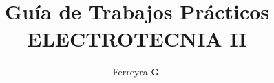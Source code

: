 \usepackage[spanish]{babel}
\usepackage[american]{circuitikz}
\usepackage{iramA4,amsmath,pgfplots,newtxtext,newtxmath,steinmetz}
\usepackage{sectsty,longtable,enumitem,tikz,subfiles,rotating}
\usepackage[toc]{glossaries}
\usepackage{subfiles}
\usepackage[]{toolsgf}
\usepackage{titletoc}
\usepackage{sectsty}
\usepackage{fancyhdr,geometry}
\usepackage{pdfpages}
\usepackage{titlesec}
\usepackage{cancel}

    \sectionfont{\sffamily\Large}
    \subsectionfont{\sffamily}

\pgfplotsset{compat=1.7}

\newcommand{\materia}{ELECTROTECNIA II}
\newcommand{\TP}{}
\newcommand{\logo}{images/logos/4124}
\newcommand{\email}{gustavoferreyra@outlook.com}
\newcommand{\classroomcode}{.......}
\newcommand{\urlqr}{https://es.scribd.com/document/528527875/}
\title{ \logoo \\ \Huge Guía de Trabajos Prácticos\\  \textbf{\materia}}
\author{Ferreyra G.}
\date{}
\sectionfont{\sffamily}
\subsectionfont{\sffamily}


